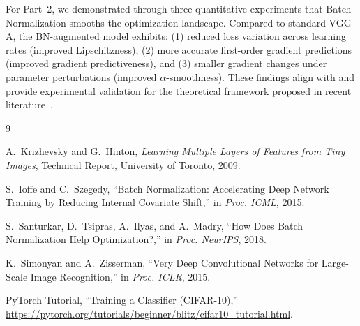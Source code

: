 \documentclass[11pt,a4paper]{article}
\begin{document}
For Part~2, we demonstrated through three quantitative experiments that Batch Normalization smooths the optimization landscape. Compared to standard VGG-A, the BN-augmented model exhibits: (1) reduced loss variation across learning rates (improved Lipschitzness), (2) more accurate first-order gradient predictions (improved gradient predictiveness), and (3) smaller gradient changes under parameter perturbations (improved $\alpha$-smoothness). These findings align with and provide experimental validation for the theoretical framework proposed in recent literature~\cite{santurkar2018batch}.


\begin{thebibliography}{9}

A.~Krizhevsky and G.~Hinton,
\emph{Learning Multiple Layers of Features from Tiny Images},
Technical Report, University of Toronto, 2009.

S.~Ioffe and C.~Szegedy,
``Batch Normalization: Accelerating Deep Network Training by Reducing Internal Covariate Shift,''
in \emph{Proc. ICML}, 2015.

S.~Santurkar, D.~Tsipras, A.~Ilyas, and A.~Madry,
``How Does Batch Normalization Help Optimization?,''
in \emph{Proc. NeurIPS}, 2018.

K.~Simonyan and A.~Zisserman,
``Very Deep Convolutional Networks for Large-Scale Image Recognition,''
in \emph{Proc. ICLR}, 2015.

PyTorch Tutorial,
``Training a Classifier (CIFAR-10),''
\url{https://pytorch.org/tutorials/beginner/blitz/cifar10_tutorial.html}.

\end{thebibliography}
\end{document}
